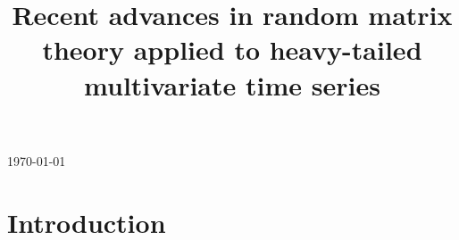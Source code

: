 \documentclass[11pt,reqno]{amsart}
\newcommand{\1}{\mathds{1}}
\newcommand{\0}{\boldsymbol{0}}
\newcommand{\4}{\mathchoice{\mskip1.5mu}{\mskip1.5mu}{}{}}
\newcommand{\5}{\mathchoice{\mskip-1.5mu}{\mskip-1.5mu}{}{}}
\newcommand{\2}{\penalty250\mskip\thickmuskip\mskip-\thinmuskip} %
\begin{document}
\today

\title[The sample covariance matrix of a heavy-tailed multivariate time series]{Recent advances in random matrix theory applied to heavy-tailed multivariate time series}

\begin{abstract}

\end{abstract}

\maketitle
\tableofcontents


\section{Introduction}\setcounter{equation}{0}
\end{document}
